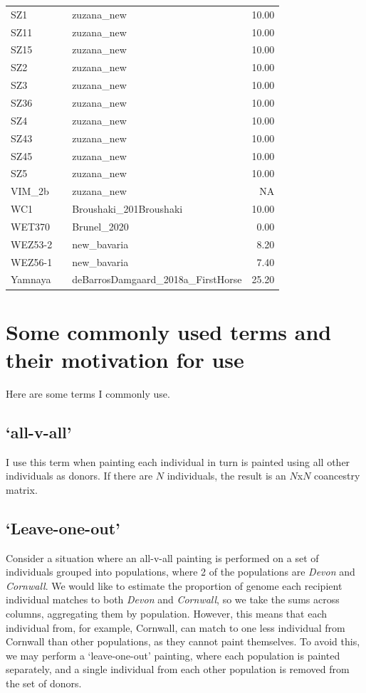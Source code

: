 \begin{longtable}[t]{lllr}
SZ1 &  & zuzana\_new & 10.00\\
SZ11 &  & zuzana\_new & 10.00\\
SZ15 &  & zuzana\_new & 10.00\\
SZ2 &  & zuzana\_new & 10.00\\
SZ3 &  & zuzana\_new & 10.00\\
SZ36 &  & zuzana\_new & 10.00\\
SZ4 &  & zuzana\_new & 10.00\\
SZ43 &  & zuzana\_new & 10.00\\
SZ45 &  & zuzana\_new & 10.00\\
SZ5 &  & zuzana\_new & 10.00\\
VIM\_2b &  & zuzana\_new & NA\\
WC1 &  & Broushaki\_201Broushaki & 10.00\\
WET370 &  & Brunel\_2020 & 0.00\\
WEZ53-2 &  & new\_bavaria & 8.20\\
WEZ56-1 &  & new\_bavaria & 7.40\\
Yamnaya &  & deBarrosDamgaard\_2018a\_FirstHorse & 25.20\\*
\end{longtable}
\endgroup{}





\chapter{Some commonly used terms and their motivation for use}
\label{appendixlabel2}


Here are some terms I commonly use.

\section{`all-v-all'} \label{sec:allvall}

I use this term when painting each individual in turn is painted using all other individuals as donors. If there are $N$ individuals, the result is an $N$x$N$ coancestry matrix.


\section{`Leave-one-out'} \label{sec:leave_one_out}

Consider a situation where an all-v-all painting is performed on a set of individuals grouped into populations, where 2 of the populations are \textit{Devon} and \textit{Cornwall}. We would like to estimate the proportion of genome each recipient individual matches to both \textit{Devon} and \textit{Cornwall}, so we take the sums across columns, aggregating them by population. However, this means that each individual from, for example, Cornwall, can match to one less individual from Cornwall than other populations, as they cannot paint themselves. To avoid this, we may perform a `leave-one-out' painting, where each population is painted separately, and a single individual from each other population is removed from the set of donors. 


